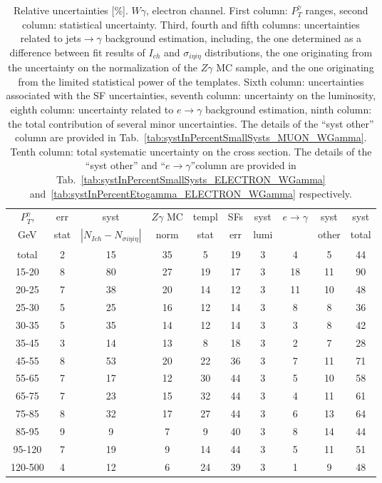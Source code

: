 \begin{table}[h]
  \scriptsize
  \begin{center}
  \caption{Relative uncertainties [\%]. $W\gamma$, electron channel. First column: $P_T^{\gamma}$ ranges, second column: statistical uncertainty. Third, fourth and fifth columns: uncertainties related to jets$\rightarrow\gamma$ background estimation, including, the one determined as a difference between fit results of $I_{ch}$ and $\sigma_{i\eta i\eta}$ distributions, the one originating from the uncertainty on the normalization of the $Z\gamma$ MC sample, and the one originating from the limited statistical power of the templates. Sixth column: uncertainties associated with the SF uncertainties, seventh column: uncertainty on the luminosity, eighth column: uncertainty related to $e\rightarrow\gamma$ background estimation, ninth column: the total contribution of several minor uncertainties. The details of the ``syst other'' column are provided in Tab.~\ref{tab:systInPercentSmallSysts_MUON_WGamma}. Tenth column: total systematic uncertainty on the cross section. The details of the ``syst other'' and ``$e\rightarrow\gamma$''column are provided in Tab.~\ref{tab:systInPercentSmallSysts_ELECTRON_WGamma} and~\ref{tab:systInPercentEtogamma_ELECTRON_WGamma} respectively. }
   \begin{tabular}{|c|c|c|c|c|c|c|c|c|c|}
    $P_T^{\gamma}$,  & err & syst & $Z\gamma$ MC & templ & SFs & syst & $e\rightarrow\gamma$ & syst & syst\\
    GeV  & stat & $|N_{Ich}-N_{\sigma{i\eta i\eta}}|$ & norm & stat & err & lumi &  & other & total\\ \hline
    total  & 2 & 15 & 35 & 5 & 19 & 3 & 4 & 5 & 44 \\ \hline
    15-20 & 8 & 80 & 27 & 19 & 17 & 3 & 18 & 11 & 90 \\ \hline
    20-25 & 7 & 38 & 20 & 14 & 12 & 3 & 11 & 10 & 48 \\ \hline
    25-30 & 5 & 25 & 16 & 12 & 14 & 3 & 8 & 8 & 36 \\ \hline
    30-35 & 5 & 35 & 14 & 12 & 14 & 3 & 3 & 8 & 42 \\ \hline
    35-45 & 3 & 14 & 13 & 8 & 18 & 3 & 2 & 7 & 28 \\ \hline
    45-55 & 8 & 53 & 20 & 22 & 36 & 3 & 7 & 11 & 71 \\ \hline
    55-65 & 7 & 17 & 12 & 30 & 44 & 3 & 5 & 10 & 58 \\ \hline
    65-75 & 7 & 23 & 15 & 32 & 44 & 3 & 4 & 11 & 61 \\ \hline
    75-85 & 8 & 32 & 17 & 27 & 44 & 3 & 6 & 13 & 64 \\ \hline
    85-95 & 9 & 9 & 7 & 9 & 40 & 3 & 8 & 14 & 44 \\ \hline
    95-120 & 7 & 19 & 9 & 14 & 44 & 3 & 5 & 11 & 51 \\ \hline
    120-500 & 4 & 12 & 6 & 24 & 39 & 3 & 1 & 9 & 48 \\ \hline
  \end{tabular}
  \label{tab:systInPercent_ELECTRON_WGamma}
  \end{center}
\end{table}



